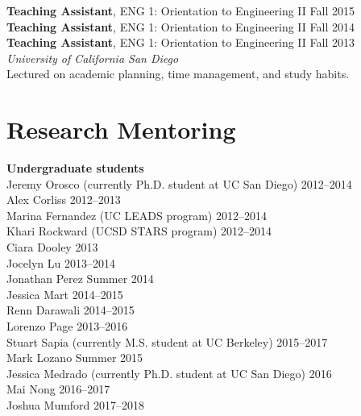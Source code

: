\documentclass[10pt]{res}
\begin{document}
\begin{resume}
\textbf{Teaching Assistant}, ENG 1: Orientation to Engineering II \hfill Fall 2015 \\
\textbf{Teaching Assistant}, ENG 1: Orientation to Engineering II \hfill Fall 2014 \\
\textbf{Teaching Assistant}, ENG 1: Orientation to Engineering II \hfill Fall 2013 \\
\textit{University of California San Diego} \\
Lectured on academic planning, time management, and study habits.



\section{Research Mentoring}
\vspace{0.1in}

\textbf{Undergraduate students} \\
Jeremy Orosco (currently Ph.D. student at UC San Diego) \hfill 2012--2014 \\
Alex Corliss \hfill 2012--2013 \\
Marina Fernandez (UC LEADS program) \hfill 2012--2014 \\
Khari Rockward (UCSD STARS program) \hfill 2012--2014 \\
Ciara Dooley \hfill 2013 \\
Jocelyn Lu \hfill 2013--2014 \\
Jonathan Perez \hfill Summer 2014 \\
Jessica Mart \hfill 2014--2015 \\
Renn Darawali \hfill 2014--2015 \\
Lorenzo Page \hfill 2013--2016 \\
Stuart Sapia (currently M.S. student at UC Berkeley) \hfill 2015--2017 \\
Mark Lozano \hfill Summer 2015 \\
Jessica Medrado (currently Ph.D. student at UC San Diego) \hfill 2016 \\
Mai Nong \hfill 2016--2017 \\
Joshua Mumford \hfill 2017--2018



\end{resume}
\end{document}

